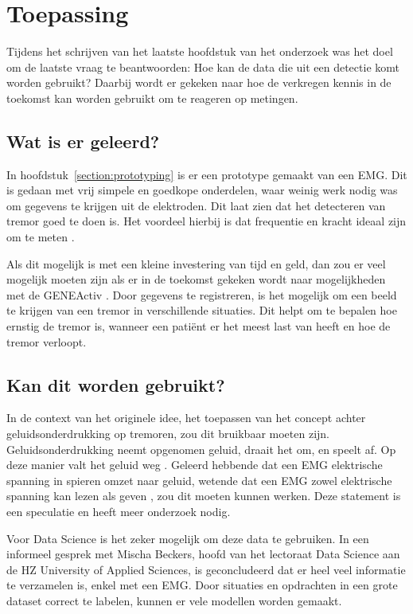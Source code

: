 \section{Toepassing}
\label{section:application}

Tijdens het schrijven van het laatste hoofdstuk van het onderzoek was het doel om de laatste vraag te beantwoorden:
Hoe kan de data die uit een detectie komt worden gebruikt?
Daarbij wordt er gekeken naar hoe de verkregen kennis in de toekomst kan worden gebruikt om te reageren op metingen.

\subsection{Wat is er geleerd?}

In hoofdstuk~\ref{section:prototyping} is er een prototype gemaakt van een EMG.
Dit is gedaan met vrij simpele en goedkope onderdelen,
waar weinig werk nodig was om gegevens te krijgen uit de elektroden.
Dit laat zien dat het detecteren van tremor goed te doen is.
Het voordeel hierbij is dat frequentie en kracht ideaal zijn om te meten \cite{elsevier2022}.

Als dit mogelijk is met een kleine investering van tijd en geld,
dan zou er veel mogelijk moeten zijn als er in de toekomst gekeken wordt naar mogelijkheden met de GENEActiv \cite{sips2024, activinsights2022}.
Door gegevens te registreren, is het mogelijk om een beeld te krijgen van een tremor in verschillende situaties.
Dit helpt om te bepalen hoe ernstig de tremor is, wanneer een patiënt er het meest last van heeft en hoe de tremor verloopt.

\subsection{Kan dit worden gebruikt?}

In de context van het originele idee,
het toepassen van het concept achter geluidsonderdrukking op tremoren, zou dit bruikbaar moeten zijn.
Geluidsonderdrukking neemt opgenomen geluid, draait het om, en speelt af.
Op deze manier valt het geluid weg \cite{bose2023}.
Geleerd hebbende dat een EMG elektrische spanning in spieren omzet naar geluid,
wetende dat een EMG zowel elektrische spanning kan lezen als geven \cite{knf2022,neuro2009,gohel2020,neurostyle2021},
zou dit moeten kunnen werken. Deze statement is een speculatie en heeft meer onderzoek nodig.

Voor Data Science is het zeker mogelijk om deze data te gebruiken.
In een informeel gesprek met Mischa Beckers, hoofd van het lectoraat Data Science aan de HZ University of Applied Sciences,
is geconcludeerd dat er heel veel informatie te verzamelen is, enkel met een EMG.
Door situaties en opdrachten in een grote dataset correct te labelen, kunnen er vele modellen worden gemaakt.